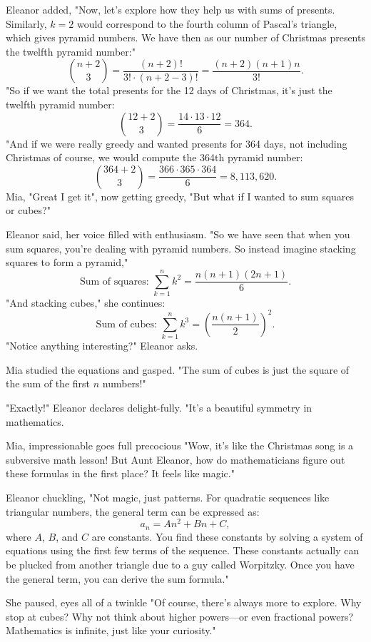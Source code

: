 \noindent
Eleanor added,  "Now, let’s explore how they help us with sums of presents. Similarly, \(k=2\) would correspond to the fourth column of Pascal’s triangle, which gives pyramid numbers. We have then as our number of Christmas presents the twelfth pyramid number:" 
\[
\binom{n+2}{3} = \frac{(n+2)!}{3! \cdot (n+2-3)!}= \frac{(n+2)(n+1)n}{3!} .
\]
"So if we want the total presents for the 12 days of Christmas, it’s just the twelfth pyramid number:
\[
\binom{12+2}{3} = \frac{14 \cdot 13 \cdot 12}{6} = 364.
\]
"And if we were really greedy and wanted presents for 364 days, not including Christmas of course, we would compute the 364th pyramid number:
\[
\binom{364+2}{3} = \frac{366 \cdot 365 \cdot 364}{6} = 8,113,620.
\]
Mia, "Great I get it", now getting greedy, "But what if I wanted to sum squares or cubes?"

Eleanor said, her voice filled with enthusiasm. "So we have seen that when you sum squares, you’re dealing with pyramid numbers. So instead imagine stacking squares to form a pyramid,"
\[
\text{Sum of squares: } \sum_{k=1}^{n} k^2 = \frac{n(n+1)(2n+1)}{6}.
\]
"And stacking cubes," she continues:
\[
\text{Sum of cubes: } \sum_{k=1}^{n} k^3 = \left(\frac{n(n+1)}{2}\right)^2.
\]
"Notice anything interesting?" Eleanor asks.

Mia studied the equations and gasped. "The sum of cubes is just the square of the sum of the first \(n\) numbers!"

"Exactly!" Eleanor declares delight-fully. "It’s a beautiful symmetry in mathematics. 

Mia, impressionable goes full precocious "Wow, it’s like the Christmas song is a subversive math lesson! But Aunt Eleanor, how do mathematicians figure out these formulas in the first place? It feels like magic."

Eleanor chuckling, "Not magic, just patterns. For quadratic sequences like triangular numbers, the general term can be expressed as:
\[
a_n = An^2 + Bn + C,
\]
where \(A\), \(B\), and \(C\) are constants. You find these constants by solving a system of equations using the first few terms of the sequence. These constants actually can be plucked from another triangle due to a guy called Worpitzky. Once you have the general term, you can derive the sum formula."

She paused, eyes all of a twinkle "Of course, there’s always more to explore. Why stop at cubes? Why not think about higher powers—or even fractional powers? Mathematics is infinite, just like your curiosity."

